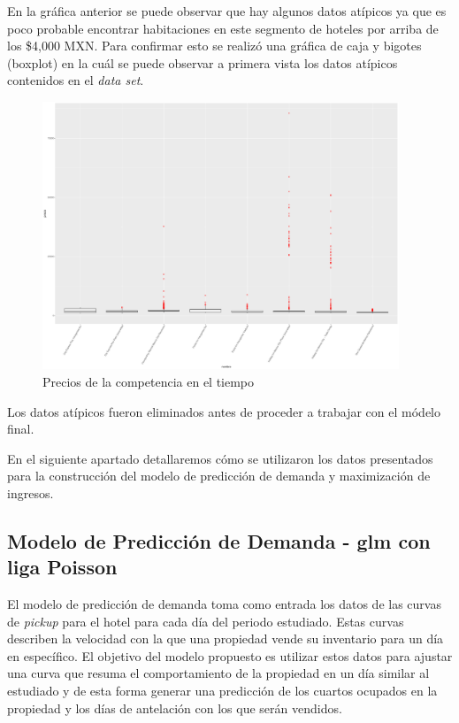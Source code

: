En la gráfica anterior se puede observar que hay algunos datos atípicos ya que es poco probable encontrar habitaciones en este segmento de hoteles por arriba de los \$4,000 MXN. Para confirmar esto se realizó una gráfica de caja y bigotes (boxplot) en la cuál se puede observar a primera vista los datos atípicos contenidos en el \emph{data set}.

\begin{figure}[H]
  \centering
      \includegraphics[width=\maxwidth,height=8cm]{figures/PreciosBoxPlot-1}    
  \caption{Precios de la competencia en el tiempo}
\end{figure}

Los datos atípicos fueron eliminados antes de proceder a trabajar con el módelo final.

En el siguiente apartado detallaremos cómo se utilizaron los datos presentados para la construcción del modelo de predicción de demanda y maximización de ingresos.


\subsection*{Modelo de Predicción de Demanda - glm con liga Poisson}

El modelo de predicción de demanda toma como entrada los datos de las curvas de \emph{pickup} para el hotel para cada día del periodo estudiado. Estas curvas describen la velocidad con la que una propiedad vende su inventario para un día en específico. El objetivo del modelo propuesto es utilizar estos datos para ajustar una curva que resuma el comportamiento de la propiedad en un día similar al estudiado y de esta forma generar una predicción de los cuartos ocupados en la propiedad y los días de antelación con los que serán vendidos.

